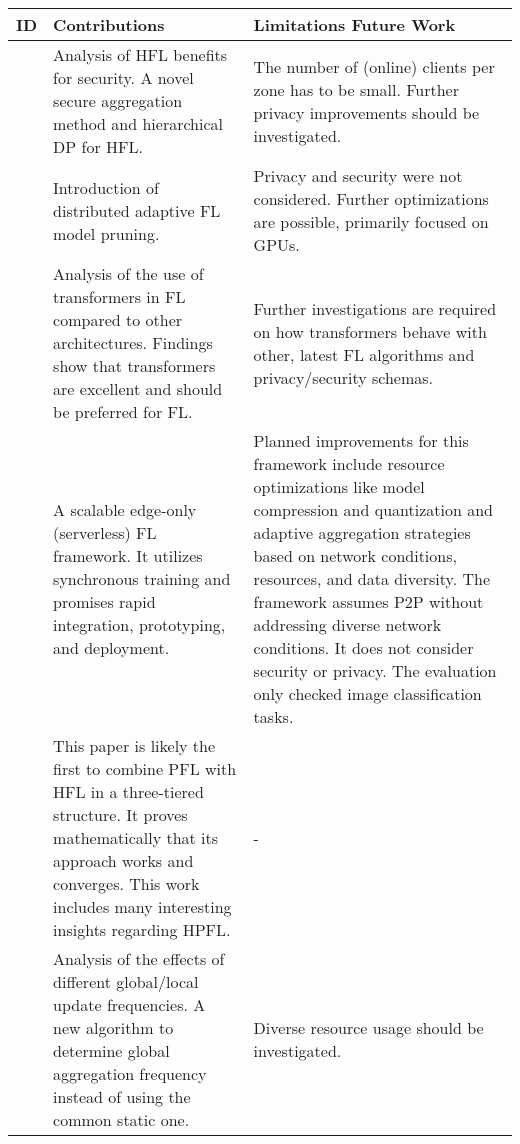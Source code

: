 \begin{changemargin}{-2cm}{0cm} 
    \begin{tabular}{|c||m{0.4\paperwidth}|m{0.4\paperwidth}|}
        \hline
            ID & Contributions & Limitations Future Work \\
        \hline
            \cite{paper:hfl_with_privacy}
            &
            Analysis of HFL benefits for security.
            A novel secure aggregation method and hierarchical DP for HFL.
            &
            The number of (online) clients per zone has to be small.
            Further privacy improvements should be investigated.
        \\
        \hline
            \cite{paper:model_pruning_for_edge_fl}
            &
            Introduction of distributed adaptive FL model pruning.
            &
            Privacy and security were not considered.
            Further optimizations are possible, primarily focused on GPUs.
        \\
        \hline
            \cite{paper:rethinking_architecture_design_in_fl_for_diverse_data}
            &
            Analysis of the use of transformers in FL compared to other architectures.
            Findings show that transformers are excellent and should be preferred for FL.
            &
            Further investigations are required on how transformers behave with other, latest FL algorithms and privacy/security schemas.
        \\
        \hline
            \cite{paper:edgefl_framework}
            &
            A scalable edge-only (serverless) FL framework.
            It utilizes synchronous training and promises rapid integration, prototyping, and deployment.
            &
            Planned improvements for this framework include
            resource optimizations like model compression and quantization and
            adaptive aggregation strategies based on network conditions, resources, and data diversity.
            The framework assumes P2P without addressing diverse network conditions.
            It does not consider security or privacy.
            The evaluation only checked image classification tasks.
        \\
        \hline
            \cite{HPFL_over_massive_mobile_edge_computing_networks}
            & 
            This paper is likely the first to combine PFL with HFL in a three-tiered structure.
            It proves mathematically that its approach works and converges.
            This work includes many interesting insights regarding HPFL.
            &
            -
        \\
        \hline
            \cite{paper:adaptive_fl_for_resource_constrained_edge}
            &
            Analysis of the effects of different global/local update frequencies.
            A new algorithm to determine global aggregation frequency instead of using the common static one.
            &
            Diverse resource usage should be investigated.
        \\


\end{tabular}
\end{changemargin}
